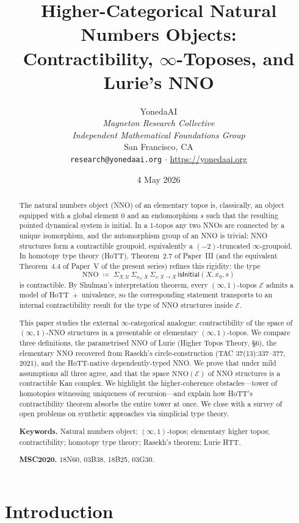 \documentclass[12pt]{article}
\title{Higher-Categorical Natural Numbers Objects:\\
Contractibility, $\infty$-Toposes, and Lurie's NNO}
\author{YonedaAI \\
\textit{Magneton Research Collective} \\
\textit{Independent Mathematical Foundations Group} \\
San Francisco, CA \\
\texttt{research@yonedaai.org} $\cdot$ \url{https://yonedaai.org}}
\date{4 May 2026}
\theoremstyle{definition}
\theoremstyle{remark}
\newcommand{\NNO}{\mathrm{NNO}}
\newcommand{\U}{\mathcal{U}}
\newcommand{\Sigmatype}{\Sigma}
\begin{document}
\maketitle

\begin{abstract}
The natural numbers object (NNO) of an elementary topos is, classically, an object equipped with a global element $0$ and an endomorphism $s$ such that the resulting pointed dynamical system is initial. In a $1$-topos any two NNOs are connected by a unique isomorphism, and the automorphism group of an NNO is trivial: NNO structures form a contractible groupoid, equivalently a $(-2)$-truncated $\infty$-groupoid. In homotopy type theory (HoTT), Theorem~2.7 of Paper~III (and the equivalent Theorem~4.4 of Paper~V of the present series) refines this rigidity: the type
\[
\NNO \;\coloneqq\; \Sigmatype_{X:\U}\,\Sigmatype_{x_{0}:X}\,\Sigmatype_{s:X\to X}\,\mathsf{isInitial}(X,x_{0},s)
\]
is contractible. By Shulman's interpretation theorem, every $(\infty,1)$-topos $\mathcal{E}$ admits a model of HoTT~+~univalence, so the corresponding statement transports to an internal contractibility result for the type of NNO structures inside $\mathcal{E}$.

This paper studies the external $\infty$-categorical analogue: contractibility of the space of $(\infty,1)$-NNO structures in a presentable or elementary $(\infty,1)$-topos. We compare three definitions, the parametrised NNO of Lurie (Higher Topos Theory, \S6), the elementary NNO recovered from Rasekh's circle-construction (TAC 37(13):337--377, 2021), and the HoTT-native dependently-typed NNO\@. We prove that under mild assumptions all three agree, and that the space $\mathrm{NNO}(\mathcal{E})$ of NNO structures is a contractible Kan complex\@. We highlight the higher-coherence obstacles---tower of homotopies witnessing uniqueness of recursion---and explain how HoTT's contractibility theorem absorbs the entire tower at once. We close with a survey of open problems on synthetic approaches via simplicial type theory.

\medskip\noindent\textbf{Keywords.} Natural numbers object; $(\infty,1)$-topos; elementary higher topos; contractibility; homotopy type theory; Rasekh's theorem; Lurie HTT\@.

\medskip\noindent\textbf{MSC2020.} 18N60, 03B38, 18B25, 03G30.
\end{abstract}

\tableofcontents

\section{Introduction}\label{sec:intro}
\end{document}
